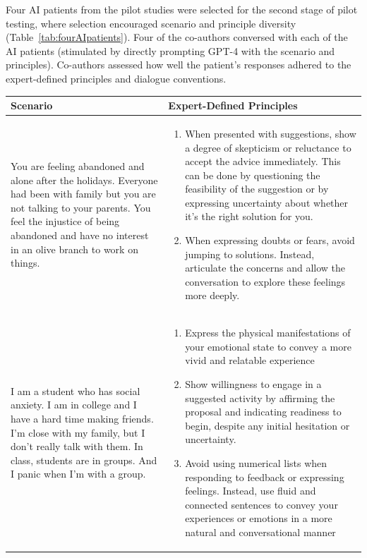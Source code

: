 \documentclass[11pt]{article}
\begin{document}
Four AI patients from the pilot studies were selected for the second stage of pilot testing, where selection encouraged scenario and principle diversity (Table~\ref{tab:fourAIpatients}). Four of the co-authors conversed with each of the AI patients (stimulated by directly prompting GPT-4 with the scenario and principles). Co-authors assessed how well the patient's responses adhered to the expert-defined principles and dialogue conventions.


\begin{table}[ht]
    \small
    \centering
    \begin{tabular}{|p{}|p{}|}
        \hline \textbf{Scenario}& \textbf{Expert-Defined Principles}\\ \hline
        You are feeling abandoned and alone after the holidays. Everyone had been with family but you are not talking to your parents. You feel the injustice of being abandoned and have no interest in an olive branch to work on things.&
        \begin{enumerate}[nosep]
            \item When presented with suggestions, show a degree of skepticism or reluctance to accept the advice immediately. This can be done by questioning the feasibility of the suggestion or by expressing uncertainty about whether it's the right solution for you.
            \item When expressing doubts or fears, avoid jumping to solutions. Instead, articulate the concerns and allow the conversation to explore these feelings more deeply.
        \end{enumerate}\\ \hline
        I am a student who has social anxiety. I am in college and I have a hard time making friends. I'm close with my family, but I don't really talk with them. In class, students are in groups. And I panic when I'm with a group.&
        \begin{enumerate}[nosep]
            \item Express the physical manifestations of your emotional state to convey a more vivid and relatable experience
            \item Show willingness to engage in a suggested activity by affirming the proposal and indicating readiness to begin, despite any initial hesitation or uncertainty.
            \item Avoid using numerical lists when responding to feedback or expressing feelings. Instead, use fluid and connected sentences to convey your experiences or emotions in a more natural and conversational manner

\end{enumerate}
\end{tabular}
\end{table}
\end{document}
